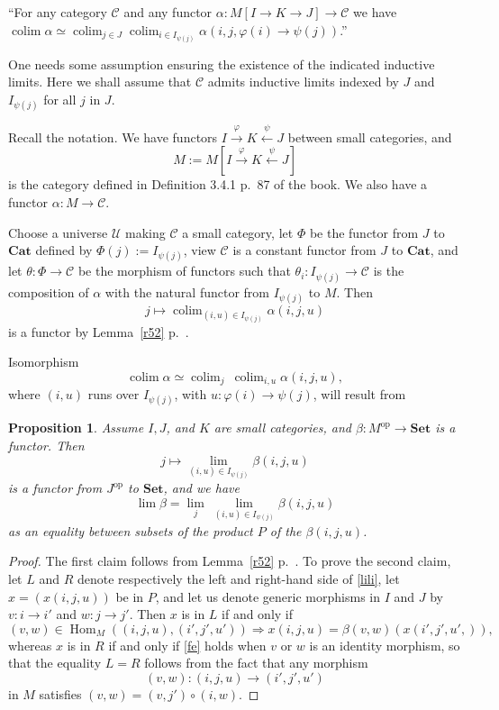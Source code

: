 \documentclass[12pt]{article}
\newtheorem{prop}[thm]{Proposition}
\theoremstyle{remark}
\theoremstyle{definition}
\newcommand{\C}{\mathcal C}
\newcommand{\U}{\mathcal U}
\newcommand{\Cat}{\mathbf{Cat}}%
\newcommand{\Set}{\mathbf{Set}}
\newcommand{\then}{\Rightarrow}
\DeclareMathOperator*{\co}{colim}
\DeclareMathOperator{\Hom}{Hom}%
\DeclareMathOperator{\op}{op}
\begin{document}
``For any category $\C$ and any functor $\alpha:M[I\to K\rightarrow J]\to\C$ we have $\co\alpha\simeq\co_{j\in J}\co_{i\in I_{\psi(j)}}\alpha(i,j,\varphi(i)\to\psi(j))$.'' 

One needs some assumption ensuring the existence of the indicated inductive limits. Here we shall assume that $\C$ admits inductive limits indexed by $J$ and $I_{\psi(j)}$ for all $j$ in $J$. 

Recall the notation. We have functors $I\xrightarrow\varphi K\xleftarrow\psi J$ between small categories, and 
$$
M:=M[I\xrightarrow\varphi K\xleftarrow\psi J] 
$$ 
is the category defined in Definition 3.4.1 p.~87 of the book. We also have a functor $\alpha:M\to\C$. 

Choose a universe $\U$ making $\C$ a small category, let $\Phi$ be the functor from $J$ to $\Cat$ defined by $\Phi(j):=I_{\psi(j)}$, view $\C$ is a constant functor from $J$ to $\Cat$, and let $\theta:\Phi\to\C$ be the morphism of functors such that $\theta_i:I_{\psi(j)}\to\C$ is the composition of $\alpha$ with the natural functor from $I_{\psi(j)}$ to $M$. Then 
$$
j\mapsto\co_{(i,u)\in I_{\psi(j)}}\alpha(i,j,u) 
$$ 
is a functor by Lemma~\ref{r52} p.~\pageref{r52}. 

Isomorphism 
%
\begin{equation}\label{coco2}
\co\alpha\simeq\co_j\ \co_{i,u}\alpha(i,j,u),
\end{equation} 
%
where $(i,u)$ runs over $I_{\psi(j)}$, with $u:\varphi(i)\to\psi(j)$, will result from 
%
\begin{prop}
%
Assume $I,J$, and $K$ are small categories, and $\beta:M^{\op}\to\Set$ is a functor. Then 
$$
j\mapsto\lim_{(i,u)\in I_{\psi(j)}}\beta(i,j,u)
$$ 
is a functor from $J^{\op}$ to $\Set$, and we have
%
\begin{equation}\label{lili} 
\lim\beta=\lim_j\ \lim_{(i,u)\in I_{\psi(j)}}\beta(i,j,u) 
\end{equation} 
%
as an equality between subsets of the product $P$ of the $\beta(i,j,u)$. 
%
\end{prop} 
%
\begin{proof}
The first claim follows from Lemma~\ref{r52} p.~\pageref{r52}. To prove the second claim, let $L$ and $R$ denote respectively the left and right-hand side of \eqref{lili}, let $x=(x(i,j,u))$ be in $P$, and let us denote generic morphisms in $I$ and $J$ by $v:i\to i'$ and $w:j\to j'$. Then $x$ is in $L$ if and only if 
%
\begin{equation}\label{fe} 
(v,w)\in\Hom_M((i,j,u),(i',j',u'))\then x(i,j,u)=\beta(v,w)(x(i',j',u',)), 
\end{equation} 
%
whereas $x$ is in $R$ if and only if \eqref{fe} holds when $v$ or $w$ is an identity morphism, so that the equality $L=R$ follows from the fact that any morphism 
$$
(v,w):(i,j,u)\to(i',j',u')
$$ 
in $M$ satisfies $(v,w)=(v,j')\circ(i,w)$.
\end{proof}
\end{document}
